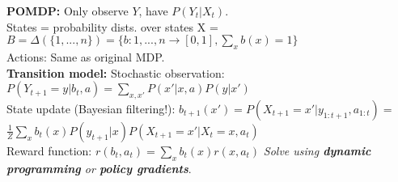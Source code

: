 \textbf{POMDP:} Only observe $Y$, have $P(Y_t|X_t)$.\\
States = probability dists. over states X =\\
\mbox{$B=\Delta(\{1,...,n\})=\{ b:{1,...,n} \rightarrow [0,1],\sum_x b(x)=1 \}$}\\
Actions: Same as original MDP.\\
\textbf{Transition model:}
Stochastic observation:\\
$P(Y_{t+1}=y|b_t,a)=\sum_{x,x'} P(x'|x,a)P(y|x')$\\
State update (Bayesian filtering!):
$b_{t+1}(x') = P(X_{t+1}=x'|y_{1:t+1},a_{1:t})=$\\$\frac{1}{Z}\sum_xb_t(x)P(y_{t+1}|x)P(X_{t+1}=x'|X_t=x,a_t)$\\
Reward function: $r(b_t, a_t)=\sum_x b_t(x)r(x,a_t)$
\emph{Solve using \textbf{dynamic programming} or \textbf{policy gradients}}.

